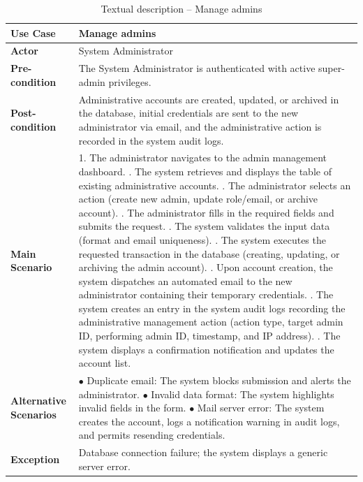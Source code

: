 \documentclass[12pt,a4paper]{report}
\begin{document}
\begin{table}[H]
\centering
\caption{Textual description -- Manage admins}
\label{tab:refinement_manage_admins}
\vspace{0.2cm}
\small
\renewcommand{\arraystretch}{1.15}
\begin{tabular}{|p{3.5cm}|p{12.0cm}|}
\hline
\textbf{Use Case} & Manage admins \\ \hline
\textbf{Actor} & System Administrator \\ \hline
\textbf{Pre-condition} & The System Administrator is authenticated with active super-admin privileges. \\ \hline
\textbf{Post-condition} & Administrative accounts are created, updated, or archived in the database, initial credentials are sent to the new administrator via email, and the administrative action is recorded in the system audit logs. \\ \hline
\textbf{Main Scenario} & 
1. The administrator navigates to the admin management dashboard. \newline
2. The system retrieves and displays the table of existing administrative accounts. \newline
3. The administrator selects an action (create new admin, update role/email, or archive account). \newline
4. The administrator fills in the required fields and submits the request. \newline
5. The system validates the input data (format and email uniqueness). \newline
6. The system executes the requested transaction in the database (creating, updating, or archiving the admin account). \newline
7. Upon account creation, the system dispatches an automated email to the new administrator containing their temporary credentials. \newline
8. The system creates an entry in the system audit logs recording the administrative management action (action type, target admin ID, performing admin ID, timestamp, and IP address). \newline
9. The system displays a confirmation notification and updates the account list. \\ \hline
\textbf{Alternative Scenarios} & 
$\bullet$ Duplicate email: The system blocks submission and alerts the administrator. \newline
$\bullet$ Invalid data format: The system highlights invalid fields in the form. \newline
$\bullet$ Mail server error: The system creates the account, logs a notification warning in audit logs, and permits resending credentials. \\ \hline
\textbf{Exception} & Database connection failure; the system displays a generic server error. \\ \hline
\end{tabular}
\end{table}
\newpage
\end{document}
